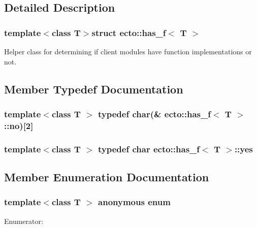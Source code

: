 \subsection{\-Detailed \-Description}
\subsubsection*{template$<$class T$>$struct ecto\-::has\-\_\-f$<$ T $>$}

\-Helper class for determining if client modules have function implementations or not. 

\subsection{\-Member \-Typedef \-Documentation}
\hypertarget{structecto_1_1has__f_ae0c6da775cf20caed616e24681af2807}{
\subsubsection[{no}]{\setlength{\rightskip}{0pt plus 5cm}template$<$class T $>$ typedef char(\& {\bf ecto\-::has\-\_\-f}$<$ \-T $>$\-::{\bf no})\mbox{[}2\mbox{]}}}\label{structecto_1_1has__f_ae0c6da775cf20caed616e24681af2807}
\hypertarget{structecto_1_1has__f_a3fb902f1eed02919195aff1a6b28eb76}{
\subsubsection[{yes}]{\setlength{\rightskip}{0pt plus 5cm}template$<$class T $>$ typedef char {\bf ecto\-::has\-\_\-f}$<$ \-T $>$\-::{\bf yes}}}\label{structecto_1_1has__f_a3fb902f1eed02919195aff1a6b28eb76}


\subsection{\-Member \-Enumeration \-Documentation}
\hypertarget{structecto_1_1has__f_a37dd9c69c6cfed2ac70c2529d493d410}{\subsubsection[{anonymous enum}]{\setlength{\rightskip}{0pt plus 5cm}template$<$class T $>$ anonymous enum}}\label{structecto_1_1has__f_a37dd9c69c6cfed2ac70c2529d493d410}
\begin{Desc}
\item[\-Enumerator\-: ]\par
\begin{description}
\item[{\em 
\hypertarget{structecto_1_1has__f_a37dd9c69c6cfed2ac70c2529d493d410a41824f56b5af096de7e6ee2ccbe9943b}{declare\-\_\-params}\label{structecto_1_1has__f_a37dd9c69c6cfed2ac70c2529d493d410a41824f56b5af096de7e6ee2ccbe9943b}
}]\end{description}
\end{Desc}

